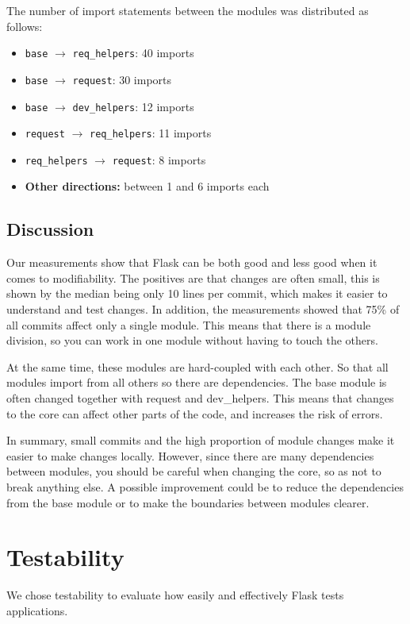 \documentclass[12pt,a4paper]{article}
\begin{document}
The number of import statements between the modules was distributed as follows:
\begin{itemize}
    \item \texttt{base} $\rightarrow$ \texttt{req\_helpers}: 40 imports
    \item \texttt{base} $\rightarrow$ \texttt{request}: 30 imports
    \item \texttt{base} $\rightarrow$ \texttt{dev\_helpers}: 12 imports
    \item \texttt{request} $\rightarrow$ \texttt{req\_helpers}: 11 imports
    \item \texttt{req\_helpers} $\rightarrow$ \texttt{request}: 8 imports
    \item \textbf{Other directions:} between 1 and 6 imports each
\end{itemize}

\subsection{Discussion}
Our measurements show that Flask can be both good and less good when it comes to modifiability. The positives are that changes are often small, this is shown by the median being only 10 lines per commit, which makes it easier to understand and test changes. In addition, the measurements showed that 75\% of all commits affect only a single module. This means that there is a module division, so you can work in one module without having to touch the others.

At the same time, these modules are hard-coupled with each other. So that all modules import from all others so there are dependencies. The base module is often changed together with request and dev\_helpers. This means that changes to the core can affect other parts of the code, and increases the risk of errors.

In summary, small commits and the high proportion of module changes make it easier to make changes locally. However, since there are many dependencies between modules, you should be careful when changing the core, so as not to break anything else. A possible improvement could be to reduce the dependencies from the base module or to make the boundaries between modules clearer.


\section{Testability}
\label{sec:testability}
We chose testability to evaluate how easily and effectively Flask tests applications.
\end{document}
